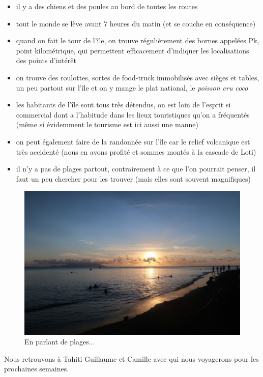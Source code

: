 \begin{itemize}
\tightlist
\item
  il y a des chiens et des poules au bord de toutes les routes
\item
  tout le monde se lève avant 7 heures du matin (et se couche en
  conséquence)
\item
  quand on fait le tour de l'île, on trouve régulièrement des bornes
  appelées Pk, point kilométrique, qui permettent efficacement
  d'indiquer les localisations des points d'intérêt
\item
  on trouve des roulottes, sortes de food-truck immobilisés avec sièges
  et tables, un peu partout sur l'île et on y mange le plat national, le
  \emph{poisson cru coco}
\item
  les habitants de l'île sont tous très détendus, on est loin de
  l'esprit si commercial dont a l'habitude dans les lieux touristiques
  qu'on a fréquentés (même si évidemment le tourisme est ici aussi une
  manne)
\item
  on peut également faire de la randonnée sur l'île car le relief
  volcanique est très accidenté (nous en avons profité et sommes montés
  à la cascade de Loti)
\item
  il n'y a pas de plages partout, contrairement à ce que l'on pourrait
  penser, il faut un peu chercher pour les trouver (mais elles sont
  souvent magnifiques)
\end{itemize}

\begin{figure}
\centering
\includegraphics{images/20180810_tahiti.JPG}
\caption{En parlant de plages...}
\end{figure}

Nous retrouvons à Tahiti Guillaume et Camille avec qui nous voyagerons
pour les prochaines semaines.

